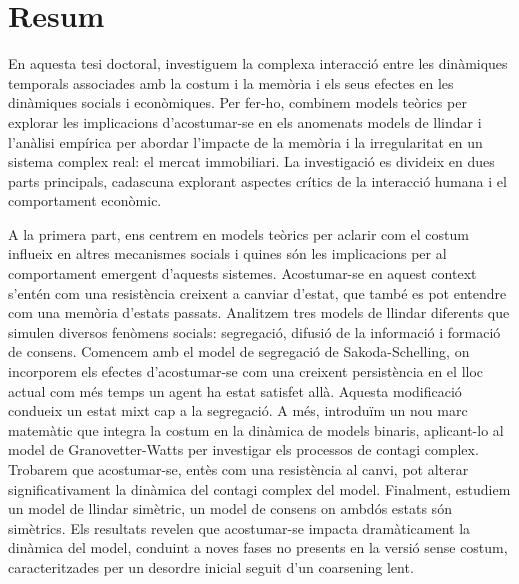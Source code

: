 \pagebreak
\thispagestyle{empty}
\section*{Resum}

En aquesta tesi doctoral, investiguem la complexa interacció entre les dinàmiques temporals associades amb la costum i la memòria i els seus efectes en les dinàmiques socials i econòmiques. Per fer-ho, combinem models teòrics per explorar les implicacions d'acostumar-se en els anomenats models de llindar i l'anàlisi empírica per abordar l'impacte de la memòria i la irregularitat en un sistema complex real: el mercat immobiliari. La investigació es divideix en dues parts principals, cadascuna explorant aspectes crítics de la interacció humana i el comportament econòmic.

A la primera part, ens centrem en models teòrics per aclarir com el costum influeix en altres mecanismes socials i quines són les implicacions per al comportament emergent d'aquests sistemes. Acostumar-se en aquest context s'entén com una resistència creixent a canviar d'estat, que també es pot entendre com una memòria d'estats passats. Analitzem tres models de llindar diferents que simulen diversos fenòmens socials: segregació, difusió de la informació i formació de consens. Comencem amb el model de segregació de Sakoda-Schelling, on incorporem els efectes d'acostumar-se com una creixent persistència en el lloc actual com més temps un agent ha estat satisfet allà. Aquesta modificació condueix un estat mixt cap a la segregació. A més, introduïm un nou marc matemàtic que integra la costum en la dinàmica de models binaris, aplicant-lo al model de Granovetter-Watts per investigar els processos de contagi complex. Trobarem que acostumar-se, entès com una resistència al canvi, pot alterar significativament la dinàmica del contagi complex del model. Finalment, estudiem un model de llindar simètric, un model de consens on ambdós estats són simètrics. Els resultats revelen que acostumar-se impacta dramàticament la dinàmica del model, conduint a noves fases no presents en la versió sense costum, caracteritzades per un desordre inicial seguit d'un coarsening lent.

